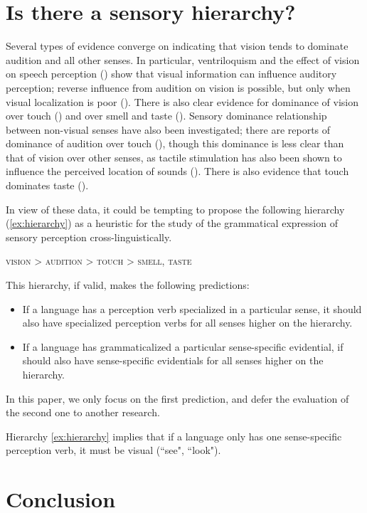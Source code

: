\documentclass[oldfontcommands,oneside,a4paper,11pt]{article}
\begin{document}
 \section{Is there a sensory hierarchy?} \label{sec:sensory}
Several types of evidence converge on indicating  that vision tends to dominate audition and all other senses. In particular,   ventriloquism  and  the effect of vision on speech perception (\citealt{mcgurk76}) show that visual information can influence auditory perception; reverse influence from audition on vision is possible, but only when visual localization is poor (\citealt{alais04ventriloq}). There is also clear evidence for dominance of vision over touch (\citealt{tastevin37aristote}) and over smell and taste (\citealt{morrot01odors}). Sensory dominance relationship between non-visual senses  have also been investigated; there are reports of dominance of audition over touch (\citealt{jousmaki98parchment}), though this dominance is less clear than that of vision over other senses, as tactile stimulation has also been shown to influence the perceived location of sounds (\citealt{caclin02tactile}). There is also evidence that touch dominates taste (\citealt{todrank91taste}).


In view of these data, it could be tempting to propose the following hierarchy (\ref{ex:hierarchy}) as a heuristic for the study of the grammatical expression of sensory perception cross-linguistically.


\begin{exe}
\ex \label{ex:hierarchy}
\glt \textsc{vision} > \textsc{audition} > \textsc{touch} > \textsc{smell}, \textsc{taste}
\end{exe}

This hierarchy, if valid, makes the following predictions:

\begin{itemize}
\item If a language has a perception verb specialized in a particular sense, it should also have specialized perception verbs for all senses higher on the hierarchy.
\item If a language has grammaticalized a particular sense-specific evidential, if should also have sense-specific evidentials for all senses higher on the hierarchy.
\end{itemize}
In this paper, we only focus on the first prediction, and defer the evaluation of the second one to another research.

Hierarchy \ref{ex:hierarchy} implies that if a language only has one sense-specific perception verb, it must be visual (``see", ``look"). 


 \section{Conclusion}
 


\end{document}

